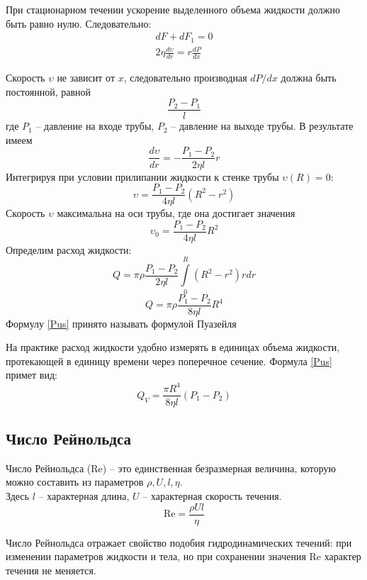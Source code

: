 \documentclass[a4paper,12pt]{article}
\theoremstyle{plain} %
\theoremstyle{definition} %
\theoremstyle{remark} %
\begin{document}
При стационарном течении ускорение выделенного объема жидкости должно быть равно нулю. Следовательно:
\begin{equation}
\begin{aligned}
dF + dF_1 = 0\\
2\eta\frac{d\upsilon}{dr} = r\frac{dP}{dx}
\end{aligned}
\end{equation}

Скорость $\upsilon$ не зависит от $x$, следовательно производная $dP/dx$ должна быть постоянной, равной
\[\frac{P_2-P_1}{l}\]
где $P_1$ -- давление на входе трубы, $P_2$ -- давление на выходе трубы. В результате имеем
\begin{equation}
\frac{d\upsilon}{dr} = -\frac{P_1-P_2}{2\eta l}r
\end{equation}
Интегрируя при условии прилипании жидкости к стенке трубы $\upsilon(R) = 0$:
\begin{equation}
\upsilon = \frac{P_1 - P_2}{4\eta l}(R^2-r^2)
\end{equation}
Скорость $\upsilon$ максимальна на оси трубы, где она достигает значения
\[\upsilon_0 = \frac{P_1 - P_2}{4\eta l}R^2\] 
Определим расход жидкости:
\[Q = \pi\rho\frac{P_1-P_2}{2\eta l}\int\limits_{0}^{R}(R^2 - r^2)rdr \]
\begin{equation}
\label{Pus}
Q = \pi\rho\frac{P_1-P_2}{8\eta l}R^4
\end{equation}
Формулу \eqref{Pus} принято называть формулой Пуазейля

На практике расход жидкости удобно измерять в единицах объема жидкости, протекающей в единицу времени через поперечное сечение. Формула \eqref{Pus} примет вид:
\begin{equation}
Q_V = \frac{\pi R^4}{8\eta l}(P_1 - P_2)
\end{equation}
\subsection{Число Рейнольдса}
Число Рейнольдса (Re) -- это единственная безразмерная величина, которую можно составить из параметров $\rho, U, l, \eta$.\\
Здесь $l$ -- характерная длина, $U$ -- характерная скорость течения.
\begin{equation}
\text{Re} = \frac{\rho U l}{\eta}
\end{equation}

Число Рейнольдса отражает свойство подобия гидродинамических течений: при изменении параметров жидкости и тела, но при сохранении значения Re характер течения не меняется.
\end{document}
